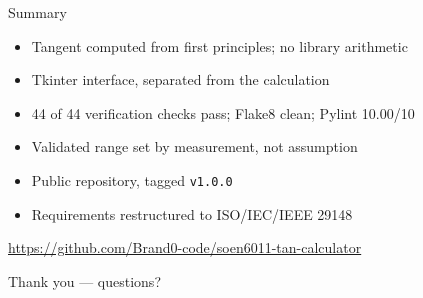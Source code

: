 \documentclass{beamer}
\begin{document}
\begin{frame}{Summary}
  \begin{itemize}
    \item Tangent computed from first principles; no library
          arithmetic
    \item Tkinter interface, separated from the calculation
    \item 44 of 44 verification checks pass; Flake8 clean;
          Pylint 10.00/10
    \item Validated range set by measurement, not assumption
    \item Public repository, tagged \texttt{v1.0.0}
    \item Requirements restructured to ISO/IEC/IEEE 29148
  \end{itemize}
  \vfill
  \begin{center}
    \small\url{https://github.com/Brand0-code/soen6011-tan-calculator}

    \vspace{0.3cm}
    \normalsize Thank you --- questions?
  \end{center}
\end{frame}
\end{document}
